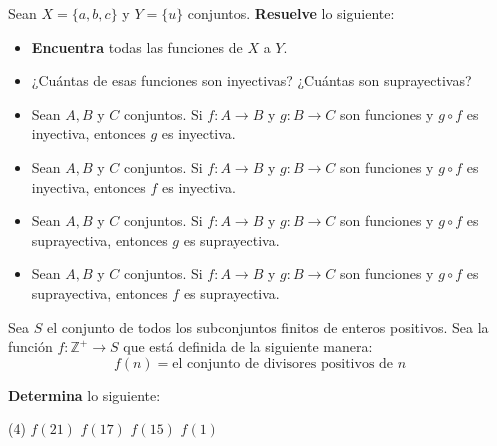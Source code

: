 \documentclass[oneside]{style}
\begin{document}
\begin{questions}[label=\protect\circled{\bfseries\arabic*}]
    \question
    {
        Sean $X = \{a,b,c\}$ y $Y = \{u\}$ conjuntos. \textbf{Resuelve} lo
        siguiente:
        \begin{itemize}
            \item \textbf{Encuentra} todas las funciones de $X$ a $Y$.
            \item ¿Cuántas de esas funciones son inyectivas? ¿Cuántas son 
            suprayectivas?
        \end{itemize}
    }

    \begin{itemize}
        \item Sean $A, B$ y $C$ conjuntos. Si $f: A \rightarrow B$ y 
        $g:B \rightarrow C$ son funciones y $g \circ f$ es inyectiva, 
        entonces $g$ es inyectiva.

        \item Sean $A, B$ y $C$ conjuntos. Si $f: A \rightarrow B$ y 
        $g:B \rightarrow C$ son funciones y $g \circ f$ es inyectiva, 
        entonces $f$ es inyectiva.
    \end{itemize}

    \begin{itemize}
        \item Sean $A, B$ y $C$ conjuntos. Si $f: A \rightarrow B$ y 
        $g:B \rightarrow C$ son funciones y $g \circ f$ es suprayectiva, 
        entonces $g$ es suprayectiva.

        \item Sean $A, B$ y $C$ conjuntos. Si $f: A \rightarrow B$ y 
        $g:B \rightarrow C$ son funciones y $g \circ f$ es suprayectiva, 
        entonces $f$ es suprayectiva.
    \end{itemize}

    \question
    {
        Sea $S$ el conjunto de todos los subconjuntos finitos de enteros 
        positivos. Sea la función $f: \mathbb{Z}^+ \rightarrow S$ que está 
        definida de la siguiente manera:
        \begin{equation*}
            f(n) = \text{el conjunto de divisores positivos de } n
        \end{equation*}

        \textbf{Determina} lo siguiente:
        \begin{tasks}(4)
            \task $f(21)$
            \task $f(17)$
            \task $f(15)$
            \task $f(1)$
        \end{tasks}
    }


\end{questions}
\end{document}
